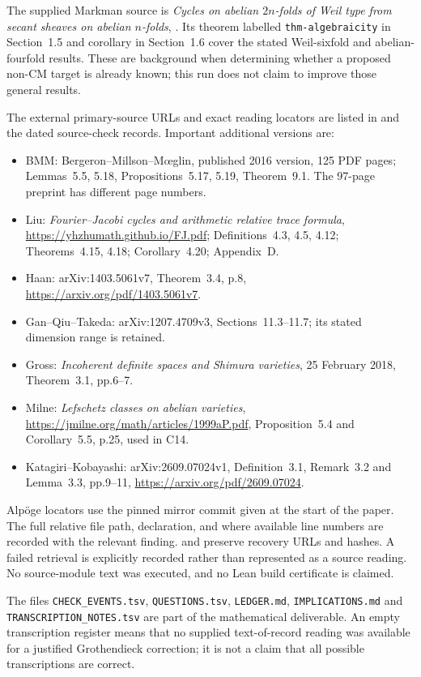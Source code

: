 \documentclass[11pt]{article}
\theoremstyle{definition}\newtheorem{definition}[theorem]{Definition}\newtheorem{remark}[theorem]{Remark}
\begin{document}
The supplied Markman source is \emph{Cycles on abelian $2n$-folds of
Weil type from secant sheaves on abelian $n$-folds},
.
Its theorem labelled \texttt{thm-algebraicity} in Section~1.5 and
corollary in Section~1.6 cover the stated Weil-sixfold and
abelian-fourfold results. These are background when determining
whether a proposed non-CM target is already known; this run does
not claim to improve those general results.

The external primary-source URLs and exact reading locators are
listed in  and the
dated source-check records. Important additional versions are:
\begin{itemize}[leftmargin=*]
\item BMM: Bergeron--Millson--M\oe glin, published 2016 version,
125 PDF pages; Lemmas~5.5, 5.18, Propositions~5.17, 5.19,
Theorem~9.1. The 97-page preprint has different page numbers.
\item Liu: \emph{Fourier--Jacobi cycles and arithmetic relative
trace formula}, \url{https://yhzhumath.github.io/FJ.pdf};
Definitions~4.3, 4.5, 4.12; Theorems~4.15, 4.18;
Corollary~4.20; Appendix~D.
\item Haan: arXiv:1403.5061v7, Theorem~3.4, p.8,
\url{https://arxiv.org/pdf/1403.5061v7}.
\item Gan--Qiu--Takeda: arXiv:1207.4709v3,
Sections~11.3--11.7; its stated dimension range is retained.
\item Gross: \emph{Incoherent definite spaces and Shimura varieties},
25 February 2018, Theorem~3.1, pp.6--7.
\item Milne: \emph{Lefschetz classes on abelian varieties},
\url{https://jmilne.org/math/articles/1999aP.pdf},
Proposition~5.4 and Corollary~5.5, p.25, used in C14.
\item Katagiri--Kobayashi: arXiv:2609.07024v1,
Definition~3.1, Remark~3.2 and Lemma~3.3, pp.9--11,
\url{https://arxiv.org/pdf/2609.07024}.
\end{itemize}

Alp\"oge locators use the pinned mirror commit given at the start
of the paper. The full relative file path, declaration, and where
available line numbers are recorded with the relevant finding.
 and
 preserve recovery
URLs and hashes. A failed retrieval is explicitly recorded rather
than represented as a source reading. No source-module text was
executed, and no Lean build certificate is claimed.

The files \texttt{CHECK\_EVENTS.tsv}, \texttt{QUESTIONS.tsv},
\texttt{LEDGER.md}, \texttt{IMPLICATIONS.md} and
\texttt{TRANSCRIPTION\_NOTES.tsv} are part of the mathematical
deliverable. An empty transcription register means that no
supplied text-of-record reading was available for a justified
Grothendieck correction; it is not a claim that all possible
transcriptions are correct.
\end{document}
